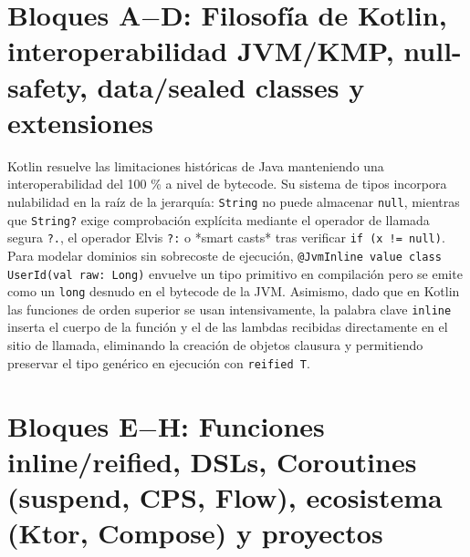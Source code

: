 \documentclass{book}
\begin{document}
\section{Bloques A\(-\)D: Filosofía de Kotlin, interoperabilidad JVM/KMP, null-safety, data/sealed classes y extensiones}

Kotlin resuelve las limitaciones históricas de Java manteniendo una interoperabilidad del 100 \% a nivel de bytecode. Su sistema de tipos incorpora nulabilidad en la raíz de la jerarquía: \texttt{String} no puede almacenar \texttt{null}, mientras que \texttt{String?} exige comprobación explícita mediante el operador de llamada segura \texttt{?.}, el operador Elvis \texttt{?:} o *smart casts* tras verificar \texttt{if (x != null)}. Para modelar dominios sin sobrecoste de ejecución, \texttt{@JvmInline value class UserId(val raw: Long)} envuelve un tipo primitivo en compilación pero se emite como un \texttt{long} desnudo en el bytecode de la JVM. Asimismo, dado que en Kotlin las funciones de orden superior se usan intensivamente, la palabra clave \texttt{inline} inserta el cuerpo de la función y el de las lambdas recibidas directamente en el sitio de llamada, eliminando la creación de objetos clausura y permitiendo preservar el tipo genérico en ejecución con \texttt{reified T}.

\section{Bloques E\(-\)H: Funciones inline/reified, DSLs, Coroutines (suspend, CPS, Flow), ecosistema (Ktor, Compose) y proyectos}
\end{document}
